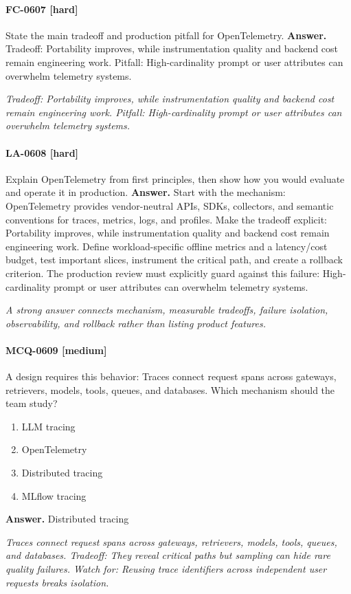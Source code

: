 \paragraph{FC-0607 [hard]} State the main tradeoff and production pitfall for OpenTelemetry.
\noindent\textbf{Answer.} Tradeoff: Portability improves, while instrumentation quality and backend cost remain engineering work. Pitfall: High-cardinality prompt or user attributes can overwhelm telemetry systems.
\par\textit{Tradeoff: Portability improves, while instrumentation quality and backend cost remain engineering work. Pitfall: High-cardinality prompt or user attributes can overwhelm telemetry systems.}
\paragraph{LA-0608 [hard]} Explain OpenTelemetry from first principles, then show how you would evaluate and operate it in production.
\noindent\textbf{Answer.} Start with the mechanism: OpenTelemetry provides vendor-neutral APIs, SDKs, collectors, and semantic conventions for traces, metrics, logs, and profiles. Make the tradeoff explicit: Portability improves, while instrumentation quality and backend cost remain engineering work. Define workload-specific offline metrics and a latency/cost budget, test important slices, instrument the critical path, and create a rollback criterion. The production review must explicitly guard against this failure: High-cardinality prompt or user attributes can overwhelm telemetry systems.
\par\textit{A strong answer connects mechanism, measurable tradeoffs, failure isolation, observability, and rollback rather than listing product features.}
\paragraph{MCQ-0609 [medium]} A design requires this behavior: Traces connect request spans across gateways, retrievers, models, tools, queues, and databases. Which mechanism should the team study?
\begin{enumerate}[label=\Alph*.]
\item LLM tracing
\item OpenTelemetry
\item Distributed tracing
\item MLflow tracing
\end{enumerate}
\noindent\textbf{Answer.} Distributed tracing
\par\textit{Traces connect request spans across gateways, retrievers, models, tools, queues, and databases. Tradeoff: They reveal critical paths but sampling can hide rare quality failures. Watch for: Reusing trace identifiers across independent user requests breaks isolation.}
